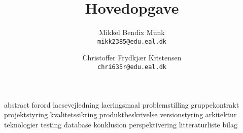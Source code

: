 \documentclass[a4paper, 11pt, danish]{report}
\title{Hovedopgave}
\author{
    Mikkel Bendix Munk\\
    \texttt{mikk2385@edu.eal.dk}
    \and
    Christoffer Frydkjær Kristensen\\
    \texttt{chri635r@edu.eal.dk}
}
\begin{document}
\maketitle
\tableofcontents{}
\newpage
{abstract}
{forord}
{laesevejledning}
{laeringsmaal}
{problemstilling}
{gruppekontrakt}
{projektstyring}
{kvalitetssikring}
{produktbeskrivelse}
{versionstyring}
{arkitektur}
{teknologier}
{testing}
{database}
{konklusion}
{perspektivering}
{litteraturliste}
{bilag}
\end{document}
